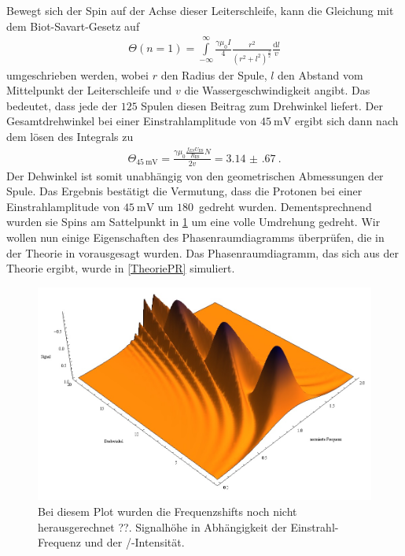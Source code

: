 \documentclass[paper=a4,
	fontsize=10pt,
	DIV=18,
	twocolumn,
	parskip=half
	]{scrartcl}
\numberwithin{equation}{section}    %
\begin{document}
Bewegt sich der Spin auf der Achse dieser Leiterschleife, kann die Gleichung mit dem Biot-Savart-Gesetz auf
\begin{align}
	\Theta(n=1)= \overset{\infty}{\underset{-\infty}{\int}}  \frac{\gamma \mu_0 I}{4}  \frac{r^2}{(r^2+l^2)^{\frac{3}{2}}} \frac{\mathrm{d}l}{v}
\end{align}
umgeschrieben werden, wobei $r$ den Radius der Spule, $l$ den Abstand vom Mittelpunkt der Leiterschleife und $v$ die Wassergeschwindigkeit angibt.
Das bedeutet, dass jede der $125$ Spulen diesen Beitrag zum Drehwinkel liefert.
Der Gesamtdrehwinkel bei einer Einstrahlamplitude von $\SI{45}{\milli\volt}$ ergibt sich dann nach dem lösen des Integrals zu
\begin{align}
	\Theta_{\SI{45}{\milli\volt}}=  \frac{\gamma \mu_0  \frac{f_{ES} U_{\mathrm{ES}}}{R_{\mathrm{ES}}} N}{2 v} = \SI{3.14(67)}{}.
\end{align}
Der Dehwinkel ist somit unabhängig von den geometrischen Abmessungen der Spule.
Das Ergebnis bestätigt die Vermutung, dass die Protonen bei einer Einstrahlamplitude von $\SI{45}{\milli\volt}$ um $180$\textdegree\ gedreht wurden.
Dementsprechnend wurden sie Spins am Sattelpunkt in \cref{phasenraum} um eine volle Umdrehung gedreht.
Wir wollen nun einige Eigenschaften des Phasenraumdiagramms überprüfen, die in der Theorie in \citep{anleitung} vorausgesagt wurden.
Das Phasenraumdiagramm, das sich aus der Theorie ergibt, wurde in \cref{TheoriePR} simuliert. 
\begin{figure}[htp]
	\begin{center}
		\includegraphics[width=\columnwidth]{Bilder/TheoriePR.jpg}
		\caption{Bei diesem Plot wurden die Frequenzshifts noch nicht herausgerechnet ??. Signalhöhe in Abhängigkeit der Einstrahl-Frequenz und der /-Intensität.}
		\label{phasenraum}
	\end{center}
\end{figure}
\end{document}
